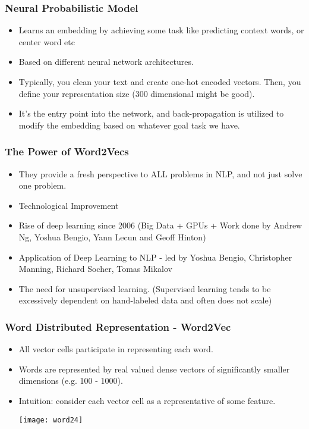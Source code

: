 \begin{frame}[fragile]\frametitle{Neural Probabilistic Model}
  \begin{itemize}
    \item Learns an embedding by achieving some task like predicting context words, or center word etc
	\item Based on different neural network architectures.
	\item Typically, you clean your text and create one-hot encoded vectors. Then, you define your representation size (300 dimensional might be good). 
	\item It’s the entry point into the network, and back-propagation is utilized to modify the embedding based on whatever goal task we have.
  \end{itemize}
  
\end{frame}

\begin{frame}[fragile]\frametitle{The Power of Word2Vecs}

\begin{itemize}
\item They provide a fresh perspective to ALL  problems in NLP, and not just solve one problem.
\item Technological Improvement
\item Rise of deep learning since 2006 (Big Data + GPUs  + Work done by Andrew Ng, Yoshua Bengio, Yann Lecun and Geoff Hinton)
\item Application of Deep Learning to NLP - led by Yoshua Bengio,  Christopher Manning, Richard Socher, Tomas Mikalov
\item The need for unsupervised learning. (Supervised learning tends to be excessively dependent on hand-labeled data and often does not scale)
\end{itemize}
\end{frame}


\begin{frame}[fragile]\frametitle{Word Distributed Representation - Word2Vec}
\begin{itemize}
\item All vector cells participate in representing each word.
\item Words are represented by real valued dense vectors of significantly smaller dimensions (e.g. 100 - 1000).
\item  Intuition: consider each vector cell as a representative of some feature.
\begin{center}
\texttt{[image: word24]}
\end{center}
\end{itemize}
\end{frame}

